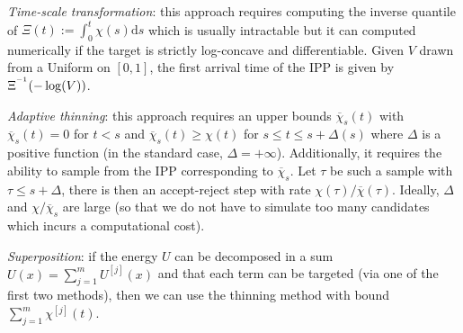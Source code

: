     \emph{Time-scale transformation}: this approach requires computing the inverse quantile of $\Xi(t):=\int_{0}^{t} \chi(s)\mathrm{d}s$ which is usually intractable but it can computed numerically if the target is strictly log-concave and differentiable. Given $V$ drawn from a Uniform on $[0,1]$, the first arrival time of the IPP is given by $\Xi^{^{-1}}(-\log(V))$.
    
    \emph{Adaptive thinning}: this approach requires an upper bounds $\overline{\chi}_{s}(t)$ with $\overline\chi_{s}(t)=0$ for $t<s$ and $\overline\chi_{s}(t)\ge\chi(t)$ for $s\le t\le s+\Delta(s)$ where $\Delta$ is a positive function (in the standard case, $\Delta=+\infty$). Additionally, it requires the ability to sample from the IPP corresponding to $\overline\chi_{s}$. Let $\tau$ be such a sample with $\tau\le s+\Delta$, there is then an accept-reject step with rate $\chi(\tau)/\overline\chi(\tau)$. Ideally, $\Delta$ and $\chi/\overline\chi_{s}$ are large (so that we do not have to simulate too many candidates which incurs a computational cost).
 
    \emph{Superposition}: if the energy $U$ can be decomposed in a sum $U(x)=\sum_{j=1}^{m}U^{[j]}(x)$ and that each term can be targeted (via one of the first two methods), then we can use the thinning method with bound $\sum_{j=1}^{m}\chi^{[j]}(t)$.


%


